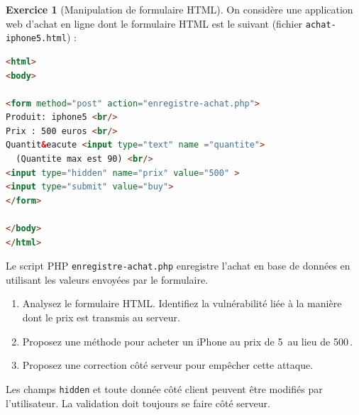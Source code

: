 \documentclass[a4paper,11pt]{article}
\theoremstyle{plain}
\theoremstyle{definition}
\newtheorem{exercice}{Exercice}
\begin{document}
\begin{exercice}[Manipulation de formulaire HTML]

On considère une application web d'achat en ligne dont le formulaire HTML est le suivant (fichier \texttt{achat-iphone5.html}) :

\begin{lstlisting}[language=HTML]
<html>
<body>

<form method="post" action="enregistre-achat.php">
Produit: iphone5 <br/>
Prix : 500 euros <br/>
Quantit&eacute <input type="text" name ="quantite">
  (Quantite max est 90) <br/>
<input type="hidden" name="prix" value="500" >
<input type="submit" value="buy">
</form>

</body>
</html>
\end{lstlisting}

Le script PHP \texttt{enregistre-achat.php} enregistre l'achat en base de données en utilisant les valeurs envoyées par le formulaire.

\begin{enumerate}
    \item Analysez le formulaire HTML. Identifiez la vulnérabilité liée à la manière dont le prix est transmis au serveur.
    \item Proposez une méthode pour acheter un iPhone au prix de 5\,\texteuro{} au lieu de 500\,\texteuro{}.
    \item Proposez une correction côté serveur pour empêcher cette attaque.
\end{enumerate}

\begin{pointcle}
Les champs \texttt{hidden} et toute donnée côté client peuvent être modifiés par l'utilisateur. La validation doit toujours se faire côté serveur.
\end{pointcle}

\end{exercice}


\end{document}
